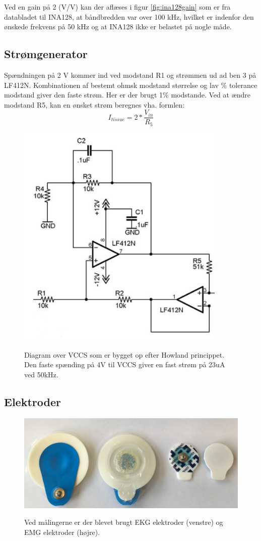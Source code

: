 Ved en gain på 2 (V/V) kan der aflæses i figur \ref{fig:ina128gain} som er fra databladet til INA128, at båndbredden var over 100 kHz, hvilket er indenfor den ønskede frekvens på 50 kHz og at INA128 ikke er belastet på nogle måde. 

\subsection{Strømgenerator}

Spændningen på 2 V kommer ind ved modstand R1 og strømmen ud ad ben 3 på LF412N. Kombinationen af bestemt ohmsk modstand størrelse og lav \% tolerance modstand giver den faste strøm. Her er der brugt 1\% modstande. Ved at ændre modstand R5, kan en ønsket strøm beregnes vha. formlen\cite{Aroom2009}: $$I_{tissue}=2*\frac{V_{in}}{R_{5}}$$


\begin{figure}[H]
\centering
{\includegraphics[width=10cm]
{Figure/howland1}}
\caption{Diagram over VCCS som er bygget op efter Howland princippet. Den faste spænding på 4V til VCCS giver en fast strøm på 23uA ved 50kHz.}
\label{fig:howland1}
\end{figure}




\subsection{Elektroder}

\begin{figure}[H]
\centering
{\includegraphics[width=12cm]
{Figure/elektroder}}
\caption{Ved målingerne er der blevet brugt EKG elektroder (venstre) og EMG elektroder (højre).}
\label{fig:elektroder}
\end{figure}


